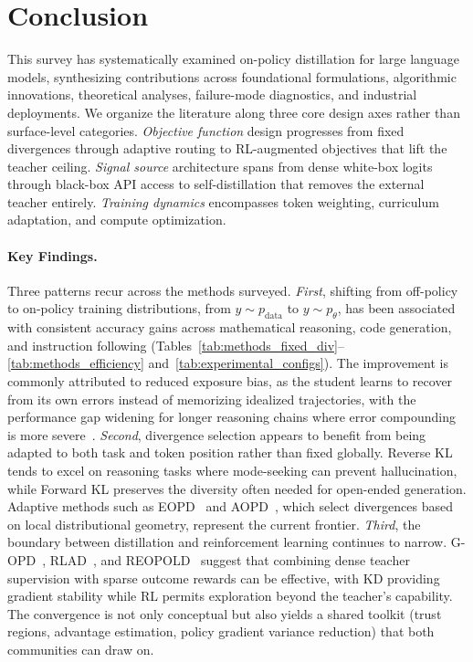 \documentclass{article} %
\newcommand{\ptheta}{p_\theta}
\newcommand{\pdata}{p_{\mathrm{data}}}
\begin{document}
\section{Conclusion}
\label{sec:conclusion}

This survey has systematically examined on-policy distillation for large language models, synthesizing contributions across foundational formulations, algorithmic innovations, theoretical analyses, failure-mode diagnostics, and industrial deployments. We organize the literature along three core design axes rather than surface-level categories. \emph{Objective function} design progresses from fixed divergences through adaptive routing to RL-augmented objectives that lift the teacher ceiling. \emph{Signal source} architecture spans from dense white-box logits through black-box API access to self-distillation that removes the external teacher entirely. \emph{Training dynamics} encompasses token weighting, curriculum adaptation, and compute optimization.

\paragraph{Key Findings.} Three patterns recur across the methods surveyed. \emph{First}, shifting from off-policy to on-policy training distributions, from $y \sim \pdata$ to $y \sim \ptheta$, has been associated with consistent accuracy gains across mathematical reasoning, code generation, and instruction following (Tables~\ref{tab:methods_fixed_div}--\ref{tab:methods_efficiency} and~\ref{tab:experimental_configs}). The improvement is commonly attributed to reduced exposure bias, as the student learns to recover from its own errors instead of memorizing idealized trajectories, with the performance gap widening for longer reasoning chains where error compounding is more severe~\citep{2306.08543,2306.13649}. \emph{Second}, divergence selection appears to benefit from being adapted to both task and token position rather than fixed globally. Reverse KL tends to excel on reasoning tasks where mode-seeking can prevent hallucination, while Forward KL preserves the diversity often needed for open-ended generation. Adaptive methods such as EOPD~\citep{2603.07079} and AOPD~\citep{2605.06387}, which select divergences based on local distributional geometry, represent the current frontier. \emph{Third}, the boundary between distillation and reinforcement learning continues to narrow. G-OPD~\citep{2602.12125}, RLAD~\citep{2602.22495}, and REOPOLD~\citep{2603.11137} suggest that combining dense teacher supervision with sparse outcome rewards can be effective, with KD providing gradient stability while RL permits exploration beyond the teacher's capability. The convergence is not only conceptual but also yields a shared toolkit (trust regions, advantage estimation, policy gradient variance reduction) that both communities can draw on.
\end{document}
